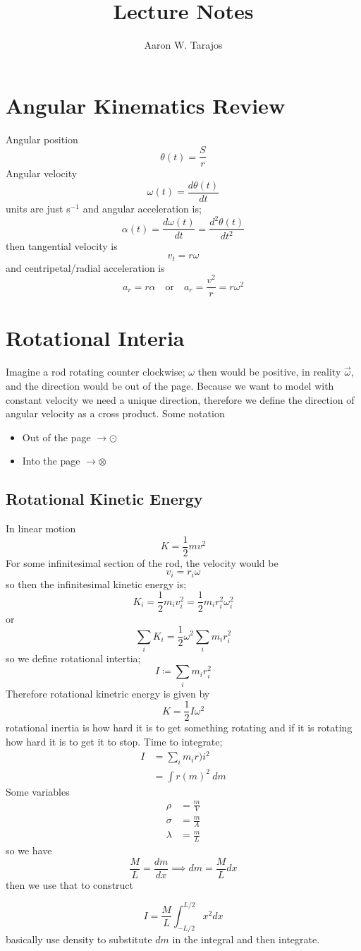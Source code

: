 \documentclass{article}
\title{Lecture Notes}
\author{Aaron W. Tarajos}
\begin{document}
\maketitle

\section{Angular Kinematics Review}
Angular position
\[
	\theta(t) = \frac{S}{r}
\]
Angular velocity
\[
	\omega(t) = \frac{d \theta(t)}{dt}
\]
units are just s$^{-1}$ and angular acceleration is;
\[
	\alpha(t) = \frac{d \omega(t)}{dt} = \frac{d^2 \theta(t)}{dt^2}
\]
then tangential velocity is
\[
	\boxed{v_t = r \omega}
\]
and centripetal/radial acceleration is
\[
	a_r = r \alpha \quad \text{or} \quad a_r = \frac{v^2}{r} = r \omega^2
\]

\section{Rotational Interia}
Imagine a rod rotating counter clockwise; $\omega$ then would be positive, in reality $\vec{\omega}$, and the direction would be out of the page. Because we want to model with constant velocity we need a unique direction, therefore we define the direction of angular velocity as a cross product. Some notation
\begin{itemize}
	\item Out of the page $\rightarrow \odot$
	\item Into the page $\rightarrow \otimes$
\end{itemize}

\subsection*{Rotational Kinetic Energy}
In linear motion
\[
	K = \frac{1}{2}mv^2
\]
For some infinitesimal section of the rod, the velocity would be
\[
	v_i = r_i \omega
\]
so then the infinitesimal kinetic energy is;
\[
	K_i  = \frac{1}{2}m_i v_i^2 = \frac{1}{2}m_i r_i^2 \omega_i^2
\]
or
\[
	\sum_i K_i = \frac{1}{2} \omega^2 \sum_i m_i r_i^2
\]
so we define rotational intertia;
\begin{equation}
	I \coloneqq \sum_i m_i r_i^2
\end{equation}
Therefore rotational kinetric energy is given by
\[
	K = \frac{1}{2}I \omega^2
\]
rotational inertia is how hard it is to get something rotating and if it is rotating how hard it is to get it to stop. Time to integrate;
\begin{align*}
	I &= \sum_i m_i r)i^2 \\
	  &= \int r(m)^2\ dm
\end{align*}
Some variables
\begin{align*}
	\rho &= \frac{m}{V} \\
	\sigma &= \frac{m}{A} \\
	\lambda &= \frac{m}{L}
\end{align*}
so we have
\[
	\frac{M}{L} = \frac{dm}{dx} \implies dm = \frac{M}{L}dx
\]
then we use that to construct

\[
	I = \frac{M}{L} \int_{-L/2}^{L/2} x^2 dx
\]
basically use density to substitute $dm$ in the integral and then integrate.
\end{document}
